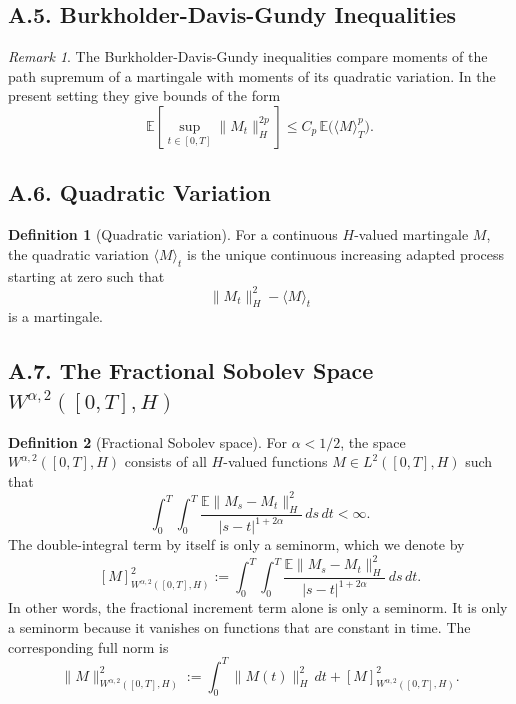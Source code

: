 \documentclass[11pt]{article}
\theoremstyle{definition}
\newtheorem{definition}{Definition}
\theoremstyle{remark}
\newtheorem{remark}{Remark}
\begin{document}
\subsection*{A.5. Burkholder-Davis-Gundy Inequalities}
\begin{remark}
The Burkholder-Davis-Gundy inequalities compare moments of the path supremum of a martingale with moments of its quadratic variation. In the present setting they give bounds of the form
\[
\mathbb E\left[\sup_{t\in[0,T]}\|M_t\|_H^{2p}\right]
\le
C_p\,\mathbb E\bigl(\langle M\rangle_T^p\bigr).
\]
\end{remark}

\subsection*{A.6. Quadratic Variation}
\begin{definition}[Quadratic variation]
For a continuous \(H\)-valued martingale \(M\), the quadratic variation \(\langle M\rangle_t\) is the unique continuous increasing adapted process starting at zero such that
\[
\|M_t\|_H^2-\langle M\rangle_t
\]
is a martingale.
\end{definition}

\subsection*{A.7. The Fractional Sobolev Space \(W^{\alpha,2}([0,T],H)\)}
\begin{definition}[Fractional Sobolev space]
For \(\alpha<1/2\), the space \(W^{\alpha,2}([0,T],H)\) consists of all \(H\)-valued functions \(M\in L^2([0,T],H)\) such that
\[
\int_0^T\int_0^T
\frac{\mathbb E\|M_s-M_t\|_H^2}{|s-t|^{1+2\alpha}}
\,ds\,dt<\infty.
\]
The double-integral term by itself is only a seminorm, which we denote by
\[
[M]_{W^{\alpha,2}([0,T],H)}^2
:=
\int_0^T\int_0^T
\frac{\mathbb E\|M_s-M_t\|_H^2}{|s-t|^{1+2\alpha}}
\,ds\,dt.
\]
In other words, the fractional increment term alone is only a seminorm. It is only a seminorm because it vanishes on functions that are constant in time.
The corresponding full norm is
\[
\|M\|_{W^{\alpha,2}([0,T],H)}^2
:=
\int_0^T \|M(t)\|_H^2\,dt
+
[M]_{W^{\alpha,2}([0,T],H)}^2.
\]
\end{definition}
\end{document}
